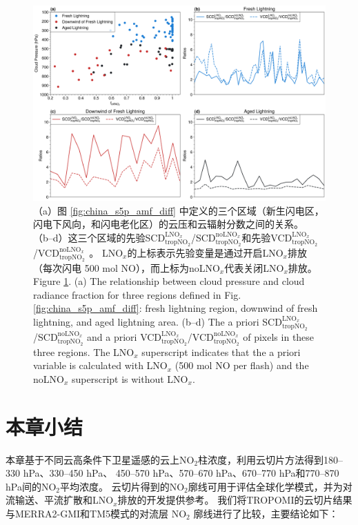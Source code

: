 \begin{figure}[H]
    \centering
    \includegraphics[width=14cm]{./figures/china_amf_contribution.png}
    \caption{
    （a）图 \ref{fig:china_s5p_amf_diff} 中定义的三个区域（新生闪电区，闪电下风向，和闪电老化区）的云压和云辐射分数之间的关系。
     （b--d）这三个区域的先验SCD$^{\textrm{LNO$_x$}}_{\textrm{tropNO$_2$}}$/SCD$^{\textrm{noLNO$_x$}}_{ \textrm{tropNO$_2$}}$和先验VCD$^{\textrm{LNO$_x$}}_{\textrm{tropNO$_2$}}$/VCD$^{\textrm{noLNO$_x$ }}_{\textrm{tropNO$_2$}}$。
     LNO$_x$的上标表示先验变量是通过开启LNO$_x$排放（每次闪电 500 mol NO），而上标为noLNO$_x$代表关闭LNO$_x$排放。\\
     Figure \ref{fig:china_amf_contribution}. (a) The relationship between cloud pressure and cloud radiance fraction for three regions defined in Fig. \ref{fig:china_s5p_amf_diff}: fresh lightning region, downwind of fresh lightning, and aged lightning area.
    (b--d) The a priori SCD$^{\textrm{LNO$_x$}}_{\textrm{tropNO$_2$}}$/SCD$^{\textrm{noLNO$_x$}}_{\textrm{tropNO$_2$}}$ and a priori VCD$^{\textrm{LNO$_x$}}_{\textrm{tropNO$_2$}}$/VCD$^{\textrm{noLNO$_x$}}_{\textrm{tropNO$_2$}}$ of pixels in these three regions. The LNO$_x$ superscript indicates that the a priori variable is calculated with LNO$_x$ (500 mol NO per flash) and the noLNO$_x$ superscript is without LNO$_x$.
    }
    \label{fig:china_amf_contribution}
\end{figure}


\section{本章小结}

本章基于不同云高条件下卫星遥感的云上NO$_2$柱浓度，利用云切片方法得到180--330 hPa、330--450 hPa、
450--570 hPa、570--670 hPa、670--770 hPa和770--870 hPa间的NO$_2$平均浓度。
云切片得到的NO$_2$廓线可用于评估全球化学模式，并为对流输送、平流扩散和LNO$_x$排放的开发提供参考。
我们将TROPOMI的云切片结果与MERRA2-GMI和TM5模式的对流层 NO$_2$ 廓线进行了比较，主要结论如下：

